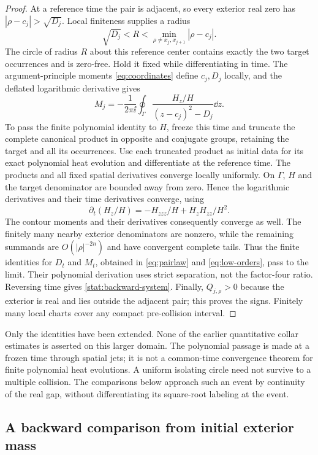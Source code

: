 \begin{proof}
At a reference time the pair is adjacent, so every exterior real zero
has $|\rho-c_j|>\sqrt{D_j}$. Local finiteness supplies a radius
\[
 \sqrt{D_j}<R<\min_{\rho\ne x_j,x_{j+1}}|\rho-c_j|.
\]
The circle of radius $R$ about this reference center contains exactly
the two target occurrences and is zero-free. Hold it fixed while
differentiating in time. The argument-principle moments
\eqref{eq:coordinates} define $c_j,D_j$ locally, and the deflated
logarithmic derivative gives
\[
 M_j=-\frac1{2\pi\ii}\oint_\Gamma
              \frac{H_z/H}{(z-c_j)^2-D_j}\dd z.
\]
To pass the finite polynomial identity to $H$, freeze this time and
truncate the complete canonical product in opposite and conjugate groups,
retaining the target and all its occurrences. Use each truncated product
as initial data for its exact polynomial heat evolution and differentiate
at the reference time. The products and all fixed spatial derivatives
converge locally uniformly. On $\Gamma$,
$H$ and the target denominator are bounded away from zero. Hence the
logarithmic derivatives and their time derivatives converge, using
\[
 \partial_t(H_z/H)=-H_{zzz}/H+H_zH_{zz}/H^2.
\]
The contour moments and their derivatives consequently converge as well.
The finitely many nearby exterior denominators are nonzero, while the
remaining summands are $O(|\rho|^{-2n})$ and have convergent complete
tails. Thus the finite identities for $D_t$ and $M_t$, obtained in
\eqref{eq:pairlaw} and \eqref{eq:low-orders}, pass to the limit.
Their polynomial derivation uses strict separation, not the factor-four
ratio. Reversing time gives \eqref{stat:backward-system}. Finally,
$Q_{j,\rho}>0$ because the exterior is real and lies outside the adjacent
pair; this proves the signs. Finitely many local charts cover any compact
pre-collision interval.
\end{proof}

Only the identities have been extended. None of the earlier quantitative
collar estimates is asserted on this larger domain. The polynomial
passage is made at a frozen time through spatial jets; it is not a
common-time convergence theorem for finite polynomial heat evolutions.
A uniform isolating circle need not survive to a multiple collision.
The comparisons below approach such an event by continuity of the real
gap, without differentiating its square-root labeling at the event.

\subsection{A backward comparison from initial exterior mass}

